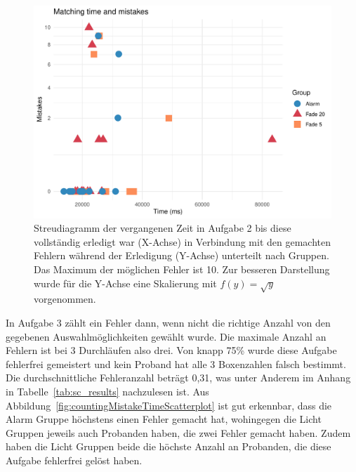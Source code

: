 \begin{figure}[H]
	\centering
	\includegraphics[width=\textwidth]{./_StudyResults/matchingMisTimeScat}
	\caption{Streudiagramm der vergangenen Zeit in Aufgabe 2 bis diese vollständig erledigt war (X-Achse) in Verbindung mit den gemachten Fehlern während der Erledigung (Y-Achse) unterteilt nach Gruppen. Das Maximum der möglichen Fehler ist 10. Zur besseren Darstellung wurde für die Y-Achse eine Skalierung mit $f(y) = \sqrt{y}$ vorgenommen.}
	\label{fig:matchingMistakeTimeScatterplot}
\end{figure}

In Aufgabe 3 zählt ein Fehler dann, wenn nicht die richtige Anzahl von den gegebenen Auswahlmöglichkeiten gewählt wurde. Die maximale Anzahl an Fehlern ist bei 3 Durchläufen also drei.
Von knapp 75\% wurde diese Aufgabe fehlerfrei gemeistert und kein Proband hat alle 3 Boxenzahlen falsch bestimmt. Die durchschnittliche Fehleranzahl beträgt 0,31, was unter Anderem im Anhang in Tabelle~\ref{tab:sc_results} nachzulesen ist.
Aus Abbildung~\ref{fig:countingMistakeTimeScatterplot} ist gut erkennbar, dass die Alarm Gruppe höchstens einen Fehler gemacht hat, wohingegen die Licht Gruppen jeweils auch Probanden haben, die zwei Fehler gemacht haben. Zudem haben die Licht Gruppen beide die höchste Anzahl an Probanden, die diese Aufgabe fehlerfrei gelöst haben.

